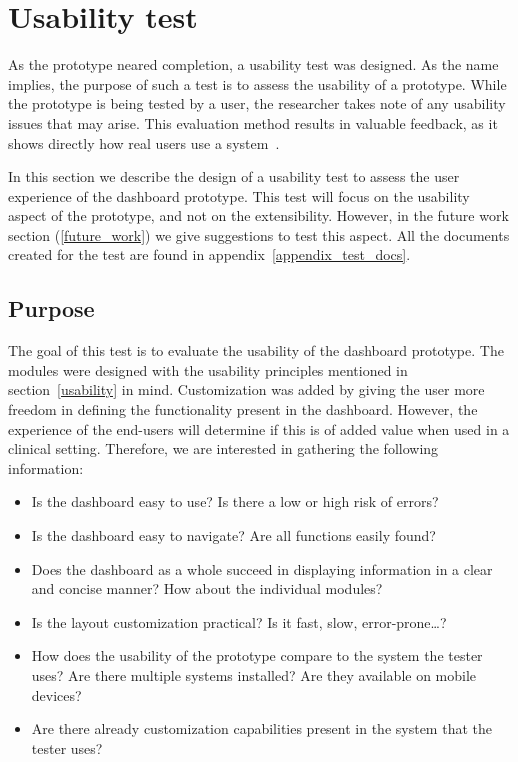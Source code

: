 \section{Usability test}\label{usabilitytest}

As the prototype neared completion, a usability test was designed. As the name implies, the purpose of such a test is to assess the usability of a prototype. While the prototype is being tested by a user, the researcher takes note of any usability issues that may arise. This evaluation method results in valuable feedback, as it shows directly how real users use a system~\cite{Nielsen1993}.

In this section we describe the design of a usability test to assess the user experience of the dashboard prototype. This test will focus on the usability aspect of the prototype, and not on the extensibility. However, in the future work section (\ref{future_work}) we give suggestions to test this aspect. All the documents created for the test are found in appendix~\ref{appendix_test_docs}.

    \subsection{Purpose}

    The goal of this test is to evaluate the usability of the dashboard prototype. The modules were designed with the usability principles mentioned in section~\ref{usability} in mind. Customization was added by giving the user more freedom in defining the functionality present in the dashboard. However, the experience of the end-users will determine if this is of added value when used in a clinical setting. Therefore, we are interested in gathering the following information:
    \begin{itemize}
        \item Is the dashboard easy to use? Is there a low or high risk of errors?
        \item Is the dashboard easy to navigate? Are all functions easily found?
        \item Does the dashboard as a whole succeed in displaying information in a clear and concise manner? How about the individual modules?
        \item Is the layout customization practical? Is it fast, slow, error-prone\ldots?
        \item How does the usability of the prototype compare to the system the tester uses? Are there multiple systems installed? Are they available on mobile devices?
        \item Are there already customization capabilities present in the system that the tester uses?
    \end{itemize}

